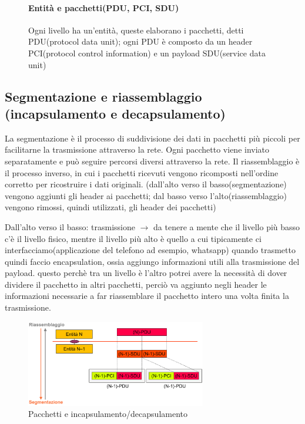 \begin{figure}[h!]
\begin{minipage}{0.5\textwidth}
\paragraph{Entità e pacchetti(PDU, PCI, SDU)}

Ogni livello ha un'entità, queste elaborano i pacchetti, detti PDU(protocol data unit);
ogni PDU è composto da un header PCI(protocol control information) e un payload SDU(service data unit) 


    \end{minipage}
\end{figure}


\subsection{Segmentazione e riassemblaggio (incapsulamento e decapsulamento)} 
La segmentazione è il processo di suddivisione dei dati in pacchetti più piccoli per facilitarne la trasmissione attraverso la rete. Ogni pacchetto viene inviato separatamente e può seguire percorsi diversi attraverso la rete. Il riassemblaggio è il processo inverso, in cui i pacchetti ricevuti vengono ricomposti nell'ordine corretto per ricostruire i dati originali.
(dall’alto verso il basso(segmentazione) vengono aggiunti gli header ai pacchetti; dal basso verso l’alto(riassemblaggio) vengono rimossi, quindi utilizzati, gli header dei pacchetti)

Dall'alto verso il basso: trasmissione $\rightarrow$ da tenere a mente che il livello più basso c’è il livello fisico, mentre il livello più alto è quello a cui tipicamente ci interfacciamo(applicazione del telefono ad esempio, whatsapp)
quando trasmetto quindi faccio encapsulation, ossia aggiungo informazioni utili alla trasmissione del payload. questo perchè tra un livello è l’altro potrei avere la necessità di dover dividere il pacchetto in altri pacchetti, perciò va aggiunto negli header le informazioni necessarie a far riassemblare il pacchetto intero una volta finita la trasmissione.
\begin{figure}[h!]
    \centering
    \includegraphics[width=0.7\textwidth]{images/ISO_OSI_incapsulamento.png}
    \caption{Pacchetti e incapsulamento/decapsulamento}
    \label{fig:pacchetti}
\end{figure}



